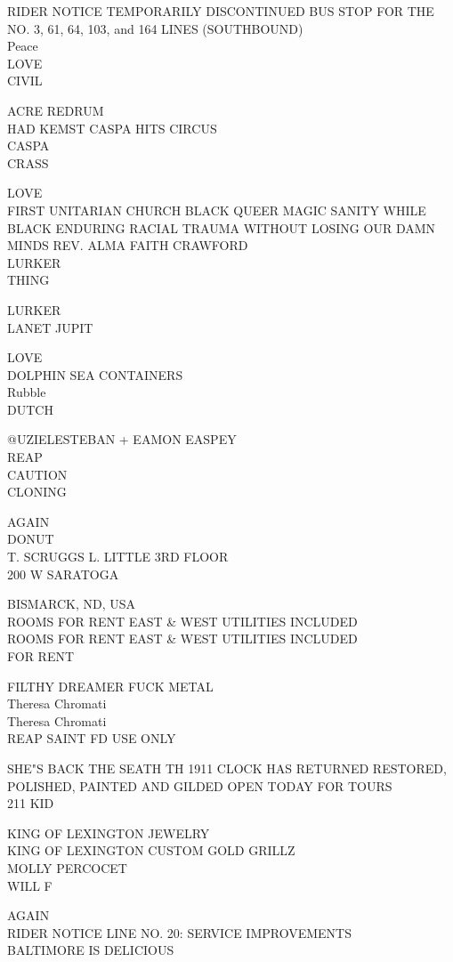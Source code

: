 \documentclass[10pt,letterpaper]{article}
\begin{document}
RIDER NOTICE TEMPORARILY DISCONTINUED BUS STOP FOR THE NO. 3, 61, 64, 103, and 164 LINES (SOUTHBOUND)\\
Peace\\
LOVE\\
CIVIL

ACRE REDRUM\\
HAD KEMST CASPA HITS CIRCUS\\
CASPA\\
CRASS

LOVE\\
FIRST UNITARIAN CHURCH BLACK QUEER MAGIC SANITY WHILE BLACK ENDURING RACIAL TRAUMA WITHOUT LOSING OUR DAMN MINDS REV. ALMA FAITH CRAWFORD\\
LURKER\\
THING

LURKER\\
LANET JUPIT

LOVE\\
DOLPHIN SEA CONTAINERS\\
Rubble\\
DUTCH

@UZIELESTEBAN + EAMON EASPEY\\
REAP\\
CAUTION\\
CLONING

AGAIN\\
DONUT\\
T. SCRUGGS L. LITTLE 3RD FLOOR\\
200 W SARATOGA

BISMARCK, ND, USA\\
ROOMS FOR RENT EAST \& WEST UTILITIES INCLUDED\\
ROOMS FOR RENT EAST \& WEST UTILITIES INCLUDED\\
FOR RENT

FILTHY DREAMER FUCK METAL\\
Theresa Chromati\\
Theresa Chromati\\
REAP SAINT FD USE ONLY

SHE"S BACK THE SEATH TH 1911 CLOCK HAS RETURNED RESTORED, POLISHED, PAINTED AND GILDED OPEN TODAY FOR TOURS\\
211 KID

KING OF LEXINGTON JEWELRY\\
KING OF LEXINGTON CUSTOM GOLD GRILLZ\\
MOLLY PERCOCET\\
WILL F

AGAIN\\
RIDER NOTICE LINE NO. 20: SERVICE IMPROVEMENTS\\
BALTIMORE IS DELICIOUS
\end{document}
